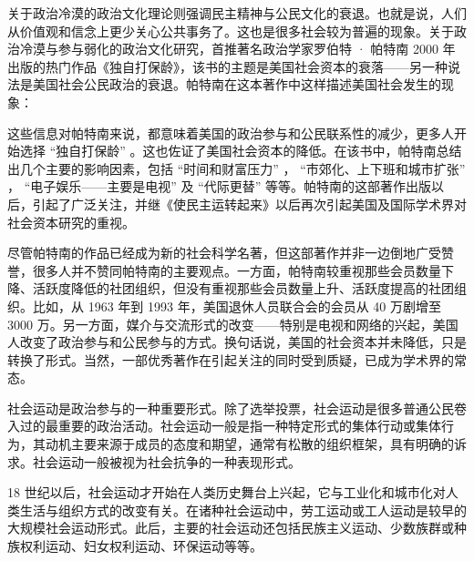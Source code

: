 关于政治冷漠的政治文化理论则强调民主精神与公民文化的衰退。也就是说，人们从价值观和信念上更少关心公共事务了。这也是很多社会较为普遍的现象。关于政治冷漠与参与弱化的政治文化研究，首推著名政治学家罗伯特 · 帕特南 2000 年出版的热门作品《独自打保龄》，该书的主题是美国社会资本的衰落——另一种说法是美国社会公民政治的衰退。帕特南在这本著作中这样描述美国社会发生的现象：


这些信息对帕特南来说，都意味着美国的政治参与和公民联系性的减少，更多人开始选择 “独自打保龄” 。这也佐证了美国社会资本的降低。在该书中，帕特南总结出几个主要的影响因素，包括 “时间和财富压力” ， “市郊化、上下班和城市扩张” ， “电子娱乐——主要是电视” 及 “代际更替” 等等。帕特南的这部著作出版以后，引起了广泛关注，并继《使民主运转起来》以后再次引起美国及国际学术界对社会资本研究的重视。

尽管帕特南的作品已经成为新的社会科学名著，但这部著作并非一边倒地广受赞誉，很多人并不赞同帕特南的主要观点。一方面，帕特南较重视那些会员数量下降、活跃度降低的社团组织，但没有重视那些会员数量上升、活跃度提高的社团组织。比如，从 1963 年到 1993 年，美国退休人员联合会的会员从 40 万剧增至 3000 万。另一方面，媒介与交流形式的改变——特别是电视和网络的兴起，美国人改变了政治参与和公民参与的方式。换句话说，美国的社会资本并未降低，只是转换了形式。当然，一部优秀著作在引起关注的同时受到质疑，已成为学术界的常态。


社会运动是政治参与的一种重要形式。除了选举投票，社会运动是很多普通公民卷入过的最重要的政治活动。社会运动一般是指一种特定形式的集体行动或集体行为，其动机主要来源于成员的态度和期望，通常有松散的组织框架，具有明确的诉求。社会运动一般被视为社会抗争的一种表现形式。

18 世纪以后，社会运动才开始在人类历史舞台上兴起，它与工业化和城市化对人类生活与组织方式的改变有关。在诸种社会运动中，劳工运动或工人运动是较早的大规模社会运动形式。此后，主要的社会运动还包括民族主义运动、少数族群或种族权利运动、妇女权利运动、环保运动等等。


